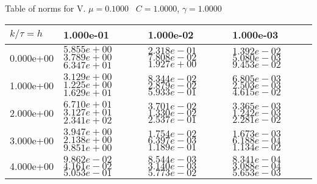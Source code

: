 \begin{center}
Table of norms for V. $\mu = 0.1000$ \, $C = 1.0000$, $\gamma = 1.0000$
  
\begin{tabular}{|p{1in}|p{1in}|p{1in}|p{1in}|} \hline
$k / \tau = h$ &1.000e-01 &1.000e-02 &1.000e-03 \\ \hline 
0.000e+00 & $5.855e+00$  $3.789e+00$  $6.347e+01$  & $2.318e-01$  $7.808e-02$  $1.927e+00$  & $1.392e-02$  $5.080e-03$  $9.453e-02$  \\ \hline 
1.000e+00 & $3.129e+00$  $1.225e+00$  $1.629e+01$  & $8.344e-02$  $2.879e-02$  $5.933e-01$  & $6.805e-03$  $2.503e-03$  $4.615e-02$  \\ \hline 
2.000e+00 & $6.710e+01$  $3.127e+01$  $2.341e+02$  & $3.701e-02$  $1.330e-02$  $2.537e-01$  & $3.365e-03$  $1.242e-03$  $2.281e-02$  \\ \hline 
3.000e+00 & $3.947e+00$  $2.138e+00$  $9.851e+00$  & $1.754e-02$  $6.397e-03$  $1.189e-01$  & $1.673e-03$  $6.188e-04$  $1.134e-02$  \\ \hline 
4.000e+00 & $9.862e-02$  $4.161e-02$  $5.053e-01$  & $8.544e-03$  $3.140e-03$  $5.773e-02$  & $8.341e-04$  $3.088e-04$  $5.653e-03$  \\ \hline 

\end{tabular}\\[20pt]
\end{center}
